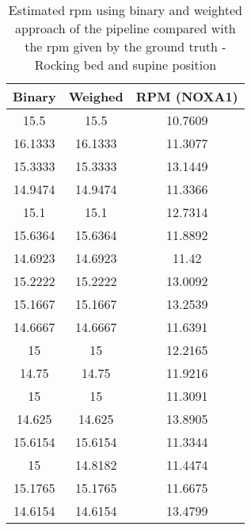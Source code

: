 \begin{table}[H]
    \centering
    \begin{tabular}{|c|c|c|}
    \hline 
    Binary & Weighed  & RPM (NOXA1) \\ 
    \hline
15.5       &  15.5    &  10.7609 \\ 
16.1333     & 16.1333  &    11.3077 \\ 
15.3333    &  15.3333   &   13.1449 \\ 
14.9474    &  14.9474    &  11.3366 \\ 
15.1       &  15.1     & 12.7314 \\ 
15.6364   &   15.6364   &   11.8892 \\ 
14.6923    &  14.6923    &    11.42 \\ 
15.2222    &  15.2222    &  13.0092 \\ 
15.1667    &  15.1667    &  13.2539 \\ 
14.6667    &  14.6667    &  11.6391 \\ 
15         &  15    &  12.2165 \\ 
14.75       & 14.75  &    11.9216 \\ 
15           &15    &  11.3091 \\ 
14.625    &   14.625   &   13.8905 \\ 
15.6154    &  15.6154   &   11.3344 \\ 
15   &   14.8182   &   11.4474 \\ 
15.1765   &   15.1765   &   11.6675 \\ 
14.6154  &    14.6154    &  13.4799 \\
\hline 
    \end{tabular}
\caption{Estimated rpm using binary and weighted approach of the pipeline compared with the rpm given by the ground truth - Rocking bed and supine position}
\label{tab:SupineMov}
\end{table}